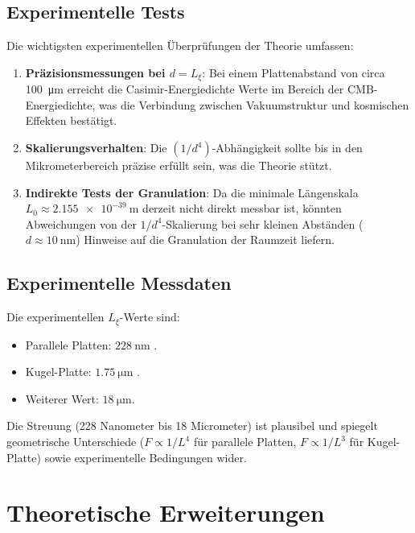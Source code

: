 	\subsection{Experimentelle Tests}
	
	Die wichtigsten experimentellen Überprüfungen der Theorie umfassen:
	
	\begin{enumerate}
		\item \textbf{Präzisionsmessungen bei \( d = L_\xi \)}: Bei einem Plattenabstand von circa \SI{100}{\micro\meter} erreicht die Casimir-Energiedichte Werte im Bereich der CMB-Energiedichte, was die Verbindung zwischen Vakuumstruktur und kosmischen Effekten bestätigt.
		\item \textbf{Skalierungsverhalten}: Die \( (1/d^4) \)-Abhängigkeit sollte bis in den Mikrometerbereich präzise erfüllt sein, was die Theorie stützt.
		\item \textbf{Indirekte Tests der Granulation}: Da die minimale Längenskala \( L_0 \approx \SI{2.155e-39}{\meter} \) derzeit nicht direkt messbar ist, könnten Abweichungen von der \( 1/d^4 \)-Skalierung bei sehr kleinen Abständen (\( d \approx \SI{10}{\nano\meter} \)) Hinweise auf die Granulation der Raumzeit liefern.
	\end{enumerate}
	
	\subsection{Experimentelle Messdaten}
	
	Die experimentellen \( L_\xi \)-Werte sind:
	\begin{itemize}
		\item Parallele Platten: \( \SI{228}{\nano\meter} \) \cite{dhital2024}.
		\item Kugel-Platte: \( \SI{1.75}{\micro\meter} \) \cite{xu2022}.
		\item Weiterer Wert: \( \SI{18}{\micro\meter} \).
	\end{itemize}
	
	Die Streuung (228 Nanometer bis 18 Micrometer) ist plausibel und spiegelt geometrische Unterschiede (\( F \propto 1/L^4 \) für parallele Platten, \( F \propto 1/L^3 \) für Kugel-Platte) sowie experimentelle Bedingungen wider.
	
	\section{Theoretische Erweiterungen}
	
